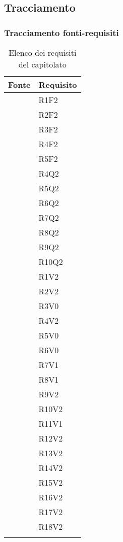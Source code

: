 					
	
	\subsection{Tracciamento}
	
		\subsubsection{Tracciamento fonti-requisiti}
			
		\begin{table}[H]
			\centering
			\begin{tabularx}{\textwidth}{YY}
				\textbf{Fonte} & \textbf{Requisito} \\
				\toprule
				 & R1F2 \\
				 & R2F2 \\
				 & R3F2 \\
				 & R4F2 \\ 
				 & R5F2 \\
				 & R4Q2 \\
				 & R5Q2 \\
				 & R6Q2 \\
				 & R7Q2 \\
				 & R8Q2 \\
				 & R9Q2 \\
				 & R10Q2 \\
				 & R1V2 \\
				 & R2V2 \\
				 & R3V0 \\
				 & R4V2 \\
				 & R5V0 \\
				 & R6V0 \\
				 & R7V1 \\
				 & R8V1 \\
				 & R9V2 \\
				 & R10V2 \\
				 & R11V1 \\
				 & R12V2 \\
				 & R13V2 \\
				 & R14V2 \\
				 & R15V2 \\
				 & R16V2 \\
				 & R17V2 \\
				  & R18V2 \\\bottomrule
				\\
			\end{tabularx}
			\caption{Elenco dei requisiti del capitolato}
		\end{table}
	
